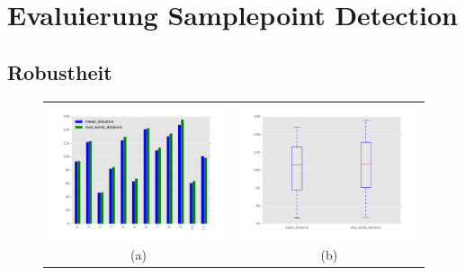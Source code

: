 \section{Evaluierung Samplepoint Detection}
\label{sec:evaluierung_samplepoint}
	
	
	
    \subsection{Robustheit}
    \label{subsec:samplepoint_robustheit}
    	\begin{figure}[h]
		\centering
		\begin{tabular}{cc}
		\includegraphics[width=7cm]{img/evaluation/sample_big_bar}&
		\includegraphics[width=7cm]{img/evaluation/sample_big_box}\\
		 (a) & (b)
		\end{tabular}
		\caption{}
	    \label{fig:sample_eval_big}
	\end{figure}

